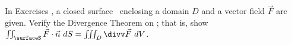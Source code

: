 {\noindent In Exercises}
{, a closed surface \surfaceS\ enclosing a domain $D$ and a vector field $\vec F$ are given. Verify the Divergence Theorem on \surfaceS; that is, show $\iint_\surfaceS \vec F\cdot \vec n\ dS = \iiint_D\divv \vec F\ dV$.
}
